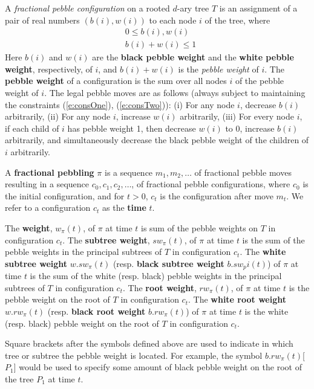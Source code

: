 \documentclass[oribib1]{llncs}
\begin{document}
\begin{definition}[Pebbling]
\label{d:pebbling}
A {\em fractional pebble configuration} on a rooted $d$-ary
tree $T$ is an assignment of
a pair of real numbers $(b(i),w(i))$ to each node $i$ of the tree, where
\begin{align}
   &  0\le b(i),w(i) \label{e:consOne} \\ &  b(i)+w(i)\le 1
   \label{e:consTwo}
\end{align}
 Here $b(i)$ and $w(i)$ are the
{\bf black pebble weight} and the {\bf white pebble weight}, respectively,
of $i$, and $b(i)+w(i)$ is the {\em pebble weight} of $i$.  The
{\bf pebble weight} of a configuration
is the sum over all nodes $i$ of the pebble
weight of $i$.  The legal pebble moves are as follows (always subject to
maintaining the constraints (\ref{e:consOne}), (\ref{e:consTwo})): (i)
For any node $i$, decrease $b(i)$ arbitrarily, (ii) For any node $i$,
increase $w(i)$ arbitrarily, (iii) For every node $i$,
if each child of
$i$ has pebble weight 1, then decrease $w(i)$ to 0, increase $b(i)$
arbitrarily, and simultaneously decrease the black pebble weight of
the children of $i$ arbitrarily.

A {\bf fractional pebbling} $\pi$ is a sequence $m_1,m_2,\ldots$
of fractional pebble moves resulting in a sequence $c_0,c_1,c_2,\ldots$,
of fractional pebble configurations, where $c_0$ is the initial
configuration, and for $t>0$, $c_t$ is the configuration after move
$m_t$.  We refer to a configuration $c_t$ as the {\bf time} $t$.

The {\bf weight}, $w_\pi(t)$, of $\pi$ at time $t$ is sum of the
pebble weights on $T$ in configuration $c_t$. The {\bf subtree weight},
$sw_\pi(t)$, of $\pi$ at time $t$ is the sum of the pebble weights in the
principal subtrees of $T$ in configuration $c_t$.
The {\bf white subtree weight} $w.sw_\pi(t)$ (resp.
{\bf black subtree weight} $b.sw_pi(t)$) of $\pi$ at time $t$ is
the sum of the white (resp. black) pebble weights in the principal
subtrees of $T$ in configuration $c_t$.  The {\bf root weight},
$rw_\pi(t)$, of $\pi$ at time $t$ is the pebble weight on the root of
$T$ in configuration $c_t$. The {\bf white root weight} $w.rw_\pi(t)$ (resp.
{\bf black root weight} $b.rw_\pi(t)$) of
$\pi$ at time $t$ is the white (resp. black) pebble weight on the root
of $T$ in configuration $c_t$.
\end{definition}

Square brackets after the symbols defined above are used to indicate in
which tree or subtree the pebble weight is located. For example, the
symbol $b.rw_\pi(t)$[$P_1$] would be used to specify some amount of
black pebble weight on the root of the tree $P_1$ at time $t$.
\end{document}

